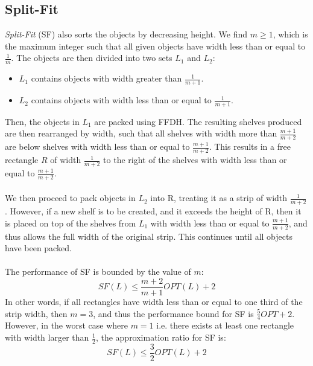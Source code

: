 \documentclass{article}
\begin{document}
\subsection{Split-Fit}
\textit{Split-Fit} (SF) also sorts the objects by decreasing height. We find $m \geq 1$, which is the maximum integer such that all given objects have width less than or equal to $\frac{1}{m}$. The objects are then divided into two sets $L_1$ and $L_2$:
\begin{itemize}
\item $L_1$ contains objects with width greater than $\frac{1}{m+1}$.
\item $L_2$ contains objects with width less than or equal to $\frac{1}{m+1}$.
\end{itemize}
Then, the objects in $L_1$ are packed using FFDH. The resulting shelves produced are then rearranged by width, such that all shelves with width more than $\frac{m+1}{m+2}$ are below shelves with width less than or equal to $\frac{m+1}{m+2}$. This results in a free rectangle $R$ of width $\frac{1}{m+2}$ to the right of the shelves with width less than or equal to $\frac{m+1}{m+2}$.\\
\\
We then proceed to pack objects in $L_2$ into R, treating it as a strip of width $\frac{1}{m+2}$. However, if a new shelf is to be created, and it exceeds the height of R, then it is placed on top of the shelves from $L_1$ with width less than or equal to $\frac{m+1}{m+2}$, and thus allows the full width of the original strip. This continues until all objects have been packed.\\
\\
The performance of SF is bounded by the value of $m$:
\[
	SF(L) \leq \frac{m+2}{m+1}OPT(L) + 2
\]
In other words, if all rectangles have width less than or equal to one third of the strip width, then $m = 3$, and thus the performance bound for SF is $\frac{5}{4}OPT + 2$. However, in the worst case where $m = 1$ i.e. there exists at least one rectangle with width larger than $\frac{1}{2}$, the approximation ratio for SF is:
\[
	SF(L) \leq \frac{3}{2}OPT(L) + 2
\]
\end{document}
